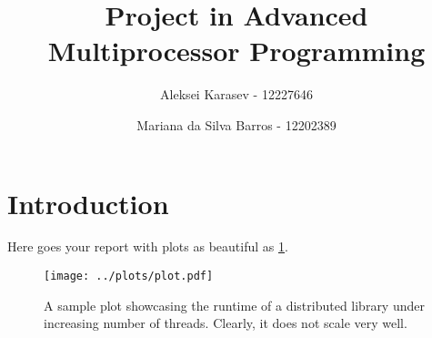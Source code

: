 \documentclass{article}
\begin{document}
\title{Project in Advanced Multiprocessor Programming}
\author[1]{Aleksei Karasev - 12227646}
\author[2]{Mariana da Silva Barros - 12202389}
\maketitle

\section{Introduction}

Here goes your report with plots as beautiful as \cref{fig:example_plot}.

\begin{figure}[ht!]
  \centering
  \texttt{[image: ../plots/plot.pdf]}
  \caption{A sample plot showcasing the runtime of a distributed library under
  increasing number of threads. Clearly, it does not scale very well.}
  \label{fig:example_plot}
\end{figure}
\end{document}
